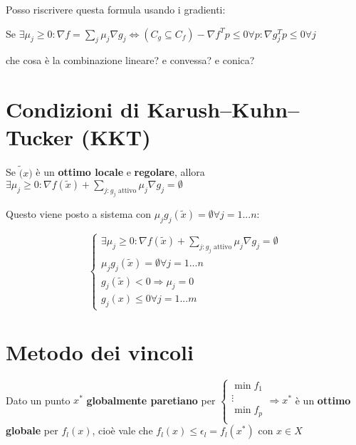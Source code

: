 \documentclass[\main/main.tex]{subfiles}
\begin{document}
Posso riscrivere questa formula usando i gradienti:

Se $\exists \mu_j \geq 0 : \nabla f = \sum_j \mu_j \nabla g_j \Leftrightarrow (C_g \subseteq C_f) -\nabla f^Tp \leq 0 \forall p: \nabla g_j^Tp \leq 0 \forall j$

che cosa è la combinazione lineare? e convessa? e conica?

\section{Condizioni di Karush–Kuhn–Tucker (KKT)}

Se $\widetilde(x)$ è un \textbf{ottimo locale} e \textbf{regolare}, allora $\exists \mu_j \geq 0: \nabla f(\widetilde{x}) + \sum_{j:g_j \text{ attivo}} \mu_j \nabla g_j = \emptyset$

Questo viene posto a sistema con $\mu_j g_j (\widetilde{x}) = \emptyset \forall j = 1...n$:

\[
	\begin{cases}
		\exists \mu_j \geq 0: \nabla f(\widetilde{x}) + \sum_{j:g_j \text{ attivo}} \mu_j \nabla g_j = \emptyset \\
		\mu_j g_j (\widetilde{x}) = \emptyset \forall j = 1...n                                                  \\
		g_j(\widetilde{x}) <0 \Rightarrow \mu_j =0                                                               \\
		g_j(x) \leq 0 \forall j = 1...m
	\end{cases}
\]

\section{Metodo dei vincoli}
Dato un punto $x^*$ \textbf{globalmente paretiano} per $\begin{cases}
		\min f_1 \\
		\vdots   \\
		\min f_p \\
	\end{cases} \Rightarrow x^*$ è un \textbf{ottimo globale} per $f_l(x)$, cioè vale che $f_l(x) \leq \epsilon_l = f_l(x^*)$ con $x \in X$
\end{document}
